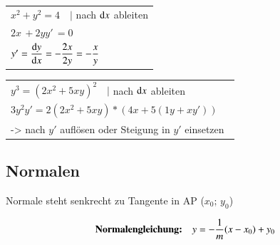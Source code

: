 \begin{minipage}[t]{0.48\columnwidth}

	\renewcommand{\arraystretch}{2.2}
	\begin{tabular}{l}
		$x^2 + y^2 = 4 \quad \Big| $ nach $ \mathop{} \! \mathrm{d} x $ ableiten  			\\
		$2x \, + 2yy' \, = 0 \quad $	\\
		$y' = \dfrac{\mathop{} \! \mathrm{d} y}{\mathop{} \! \mathrm{d} x} = - \dfrac{2x}{2y} = - \dfrac{x}{y}$
	\end{tabular}
	\renewcommand{\arraystretch}{1}
\end{minipage}		
\hfill
\begin{minipage}[t]{0.48\columnwidth}

	\renewcommand{\arraystretch}{2.2}
	\begin{tabular}{l}
		$y^3 = (2 x^2 + 5 xy)^2 \quad \Big| $ nach $ \mathop{} \! \mathrm{d} x$ ableiten		\\ 
		$3 y^2y' = 2(2 x^2 + 5 xy) * ( 4x + 5(1y + xy')) \, \quad$			\\ 
		-> nach $y'$ auflösen oder Steigung in $y'$ einsetzen
	\end{tabular}
	\renewcommand{\arraystretch}{1}
\end{minipage}


\subsection{Normalen}

\begin{minipage}[c]{0.48\columnwidth}
	Normale steht senkrecht zu Tangente in AP ($x_0; \, y_0$) 
\end{minipage}
\hfill
\begin{minipage}[c]{0.48\columnwidth}
	\[ \text{\textbf{Normalengleichung:}} \quad y = - \frac{1}{m} (x - x_0) + y_0 \]
\end{minipage}

